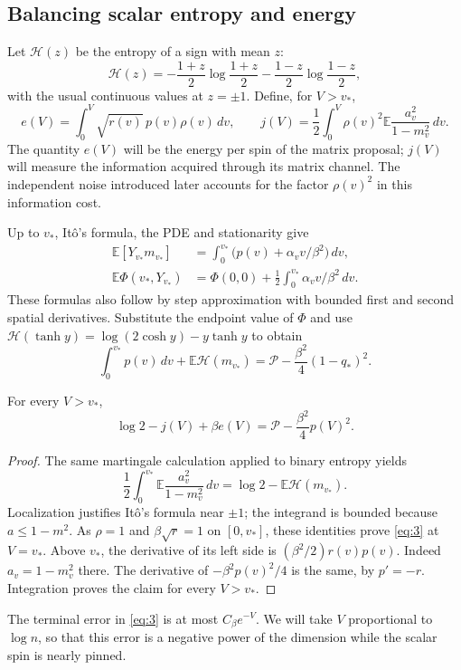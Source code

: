 \subsection{Balancing scalar entropy and energy}

Let $\mathcal H(z)$ be the entropy of a sign with mean $z$:
\[
 \mathcal H(z)=-\frac{1+z}{2}\log\frac{1+z}{2}
              -\frac{1-z}{2}\log\frac{1-z}{2},
\]
with the usual continuous values at $z=\pm1$. Define, for $V>v_*$,
\[
 e(V)=\int_0^V\sqrt{r(v)}\,p(v)\rho(v)\,dv,
 \qquad j(V)=\frac12\int_0^V\rho(v)^2
                    \mathbb E\frac{a_v^2}{1-m_v^2}\,dv.
\]
The quantity $e(V)$ will be the energy per spin of the matrix proposal;
$j(V)$ will measure the information acquired through its matrix channel.
The independent noise introduced later accounts for the factor
$\rho(v)^2$ in this information cost.

Up to $v_*$, It\^o's formula, the PDE and stationarity give
\[
 \begin{aligned}
 \mathbb E[Y_{v_*}m_{v_*}]
   &=\int_0^{v_*}\bigl(p(v)+\alpha_v v/\beta^2\bigr)\,dv,\\
 \mathbb E\Phi(v_*,Y_{v_*})
   &=\Phi(0,0)+\frac12\int_0^{v_*}\alpha_v v/\beta^2\,dv.
 \end{aligned}
\]
These formulas also follow by step approximation with bounded first
and second spatial derivatives. Substitute the endpoint value of
$\Phi$ and use
$\mathcal H(\tanh y)=\log(2\cosh y)-y\tanh y$ to obtain
\[
 \int_0^{v_*}p(v)\,dv+\mathbb E\mathcal H(m_{v_*})
 =\mathcal P-\frac{\beta^2}{4}(1-q_*)^2.
 \tag{2}\label{eq:2}
\]

\begin{lemma}\label{lem:scalar-balance}
For every $V>v_*$,
\[
 \log2-j(V)+\beta e(V)
 =\mathcal P-\frac{\beta^2}{4}p(V)^2.
 \tag{3}\label{eq:3}
\]
\end{lemma}

\begin{proof}
The same martingale calculation applied to binary entropy yields
\[
 \frac12\int_0^{v_*}\mathbb E\frac{a_v^2}{1-m_v^2}\,dv
 =\log2-\mathbb E\mathcal H(m_{v_*}).
\]
Localization justifies It\^o's formula near $\pm1$; the integrand is
bounded because $a\le1-m^2$. As $\rho=1$ and
$\beta\sqrt r=1$ on $[0,v_*]$, these identities prove
\eqref{eq:3} at $V=v_*$. Above $v_*$, the derivative of its left
side is $(\beta^2/2)r(v)p(v)$. Indeed $a_v=1-m_v^2$ there.
The derivative of $-\beta^2p(v)^2/4$ is the same, by $p'=-r$.
Integration proves the claim for every $V>v_*$.
\end{proof}

The terminal error in \eqref{eq:3} is at most $C_\beta e^{-V}$.
We will take $V$ proportional to $\log n$, so that this error is a
negative power of the dimension while the scalar spin is nearly pinned.
